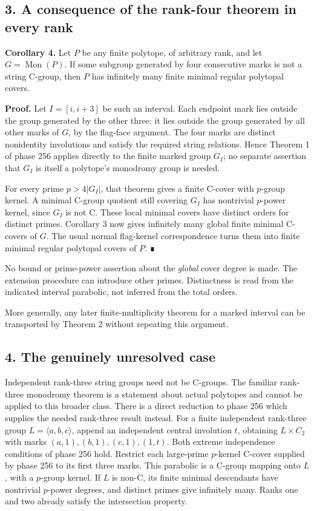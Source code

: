 \documentclass[
  11pt,
  a4paper,
]{article}
\begin{document}
\subsection{3. A consequence of the rank-four theorem in every
rank}\label{a-consequence-of-the-rank-four-theorem-in-every-rank}

\textbf{Corollary 4.} Let \(P\) be any finite polytope, of arbitrary
rank, and let \(G=\operatorname{Mon}(P)\). If some subgroup generated by
four consecutive marks is not a string C-group, then \(P\) has
infinitely many finite minimal regular polytopal covers.

\textbf{Proof.} Let \(I=[i,i+3]\) be such an interval. Each endpoint
mark lies outside the group generated by the other three: it lies
outside the group generated by all other marks of \(G\), by the
flag-face argument. The four marks are distinct nonidentity involutions
and satisfy the required string relations. Hence Theorem 1 of phase 256
applies directly to the finite marked group \(G_I\); no separate
assertion that \(G_I\) is itself a polytope's monodromy group is needed.

For every prime \(p>4|G_I|\), that theorem gives a finite C-cover with
\(p\)-group kernel. A minimal C-group quotient still covering \(G_I\)
has nontrivial \(p\)-power kernel, since \(G_I\) is not C. These local
minimal covers have distinct orders for distinct primes. Corollary 3 now
gives infinitely many global finite minimal C-covers of \(G\). The usual
normal flag-kernel correspondence turns them into finite minimal regular
polytopal covers of \(P\). ∎

No bound or prime-power assertion about the \emph{global} cover degree
is made. The extension procedure can introduce other primes.
Distinctness is read from the indicated interval parabolic, not inferred
from the total orders.

More generally, any later finite-multiplicity theorem for a marked
interval can be transported by Theorem 2 without repeating this
argument.

\subsection{4. The genuinely unresolved
case}\label{the-genuinely-unresolved-case}

Independent rank-three string groups need not be C-groups. The familiar
rank-three monodromy theorem is a statement about actual polytopes and
cannot be applied to this broader class. There is a direct reduction to
phase 256 which supplies the needed rank-three result instead. For a
finite independent rank-three group \(L=\langle a,b,c\rangle\), append
an independent central involution \(t\), obtaining \(L\times C_2\) with
marks \((a,1),(b,1),(c,1),(1,t)\). Both extreme independence conditions
of phase 256 hold. Restrict each large-prime \(p\)-kernel C-cover
supplied by phase 256 to its first three marks. This parabolic is a
C-group mapping onto \(L\), with a \(p\)-group kernel. If \(L\) is
non-C, its finite minimal descendants have nontrivial \(p\)-power
degrees, and distinct primes give infinitely many. Ranks one and two
already satisfy the intersection property.
\end{document}
